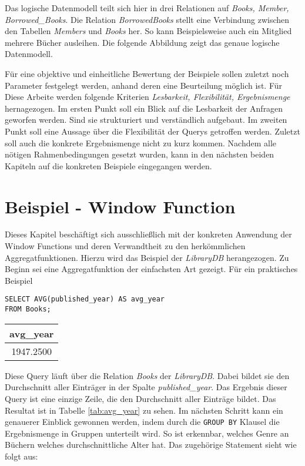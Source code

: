 Das logische Datenmodell teilt sich hier in drei Relationen auf \textit{Books, Member,
Borrowed\_Books}. Die Relation \textit{BorrowedBooks} stellt eine Verbindung
zwischen den Tabellen \textit{Members} und \textit{Books} her. So kann Beispielsweise
auch ein Mitglied mehrere Bücher ausleihen. Die folgende Abbildung zeigt das
genaue logische Datenmodell.

Für eine objektive und einheitliche Bewertung der Beispiele sollen zuletzt noch
Parameter festgelegt werden, anhand deren eine Beurteilung möglich ist. Für
Diese Arbeite werden folgende Kriterien \textit{Lesbarkeit, Flexibilität,
Ergebnismenge} hernagezogen. Im ersten Punkt soll ein Blick auf die Lesbarkeit
der Anfragen geworfen werden. Sind sie strukturiert und verständlich aufgebaut.
Im zweiten Punkt soll eine Aussage über die Flexibilität der Querys getroffen
werden. Zuletzt soll auch die konkrete Ergebnismenge nicht zu kurz kommen.
Nachdem alle nötigen Rahmenbedingungen gesetzt wurden, kann in den nächsten beiden
Kapiteln auf die konkreten Beispiele eingegangen werden.

\section{Beispiel - Window Function}
Dieses Kapitel beschäftigt sich ausschließlich mit der konkreten Anwendung der Window
Functions und deren Verwandtheit zu den herkömmlichen Aggregatfunktionen. Hierzu
wird das Beispiel der \textit{LibraryDB} herangezogen. Zu Beginn sei eine
Aggregatfunktion der einfachsten Art gezeigt. Für ein praktisches Beispiel

\begin{minipage}{0.68\textwidth}
	 \begin{lstlisting}
SELECT AVG(published_year) AS avg_year
FROM Books;
	\end{lstlisting}
\end{minipage}
\hfill
\begin{minipage}{0.28\textwidth}
	\centering
	\begin{tabular}{|c|}
		\hline
		\textbf{avg\_year} \\
		\hline
		1947.2500          \\
		\hline
	\end{tabular}
	 \label{tab:avg_year}
\end{minipage}

Diese Query läuft über die Relation \textit{Books} der \textit{LibraryDB}. Dabei
bildet sie den Durchschnitt aller Einträger in der Spalte \textit{published\_year}.
Das Ergebnis dieser Query ist eine einzige Zeile, die den Durchschnitt aller Einträge
bildet. Das Resultat ist in Tabelle \ref{tab:avg_year} zu sehen. Im nächsten Schritt
kann ein genauerer Einblick gewonnen werden, indem durch die \texttt{GROUP BY} Klausel
die Ergebnismenge in Gruppen unterteilt wird. So ist erkennbar, welches Genre an
Büchern welches durchschnittliche Alter hat. Das zugehörige Statement sieht wie
folgt aus:

